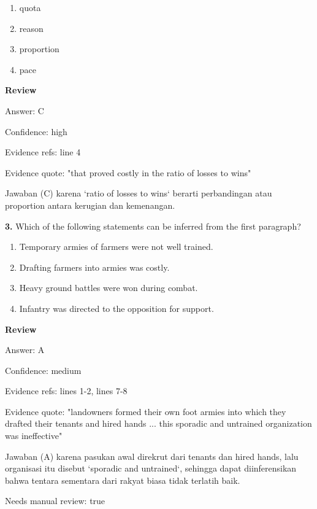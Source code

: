\documentclass[12pt]{article}
\begin{document}
\begin{enumerate}[label=(\Alph*),leftmargin=*,itemsep=0.2em]
\item quota
\item reason
\item proportion
\item pace
\end{enumerate}
\par
\begingroup
\setlength{\parskip}{0pt}
\setlength{\parindent}{0pt}
\textbf{Review}\par
Answer: C\par
Confidence: high\par
Evidence refs: line 4\par
Evidence quote: "that proved costly in the ratio of losses to wins"\par
Jawaban (C) karena `ratio of losses to wins` berarti perbandingan atau proportion antara kerugian dan kemenangan.\par
\endgroup
\par
\vspace{0.25\baselineskip}
\noindent\textbf{3.} Which of the following statements can be inferred from the first paragraph?
\begin{enumerate}[label=(\Alph*),leftmargin=*,itemsep=0.2em]
\item Temporary armies of farmers were not well trained.
\item Drafting farmers into armies was costly.
\item Heavy ground battles were won during combat.
\item Infantry was directed to the opposition for support.
\end{enumerate}
\par
\begingroup
\setlength{\parskip}{0pt}
\setlength{\parindent}{0pt}
\textbf{Review}\par
Answer: A\par
Confidence: medium\par
Evidence refs: lines 1-2, lines 7-8\par
Evidence quote: "landowners formed their own foot armies into which they drafted their tenants and hired hands ... this sporadic and untrained organization was ineffective"\par
Jawaban (A) karena pasukan awal direkrut dari tenants dan hired hands, lalu organisasi itu disebut `sporadic and untrained`, sehingga dapat diinferensikan bahwa tentara sementara dari rakyat biasa tidak terlatih baik.\par
Needs manual review: true\par
\end{document}
